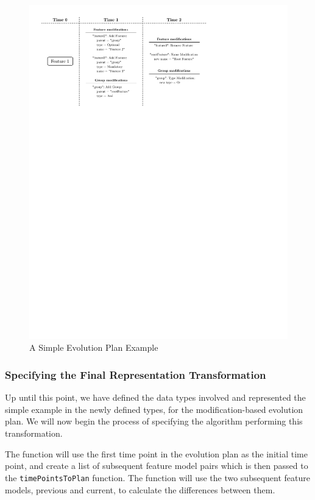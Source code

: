 \documentclass[a4paper,english]{ifimaster}
\begin{document}
\begin{figure}[htpb]
  \centering
  \includegraphics[]{simpleep_flatmod.pdf}
  \caption{A Simple Evolution Plan Example}%
  \label{fig:simpleep_flatmod}
\end{figure}

\subsubsection{Specifying the Final Representation Transformation}%
\label{ssub:specifying_the_final_representation_transformation}

Up until this point, we have defined the data types involved and represented the simple example in the newly defined types, for the modification-based evolution plan. We will now begin the process of specifying the algorithm performing this transformation. 

The function will use the first time point in the evolution plan as the initial time point, and create a list of subsequent feature model pairs which is then passed to the \texttt{time\-Points\-To\-Plan} function. The function will use the two subsequent feature models, previous and current, to calculate the differences between them.
\end{document}
